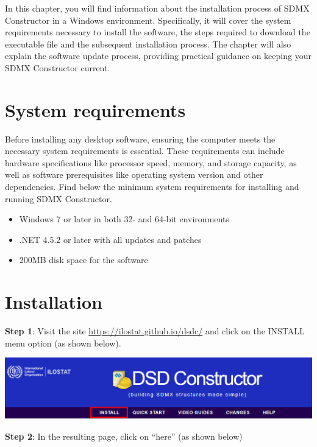 \documentclass[
]{book}
\providecommand{\tightlist}{%
  \setlength{\itemsep}{0pt}\setlength{\parskip}{0pt}}
\begin{document}
In this chapter, you will find information about the installation process of SDMX Constructor in a Windows environment. Specifically, it will cover the system requirements necessary to install the software, the steps required to download the executable file and the subsequent installation process. The chapter will also explain the software update process, providing practical guidance on keeping your SDMX Constructor current.

\hypertarget{system-requirements}{%
\section{System requirements}\label{system-requirements}}

Before installing any desktop software, ensuring the computer meets the necessary system requirements is essential. These requirements can include hardware specifications like processor speed, memory, and storage capacity, as well as software prerequisites like operating system version and other dependencies. Find below the minimum system requirements for installing and running SDMX Constructor.

\begin{itemize}
\tightlist
\item
  Windows 7 or later in both 32- and 64-bit environments
\item
  .NET 4.5.2 or later with all updates and patches
\item
  200MB disk space for the software
\end{itemize}

\hypertarget{installation}{%
\section{Installation}\label{installation}}

\textbf{Step 1}: Visit the site \url{https://ilostat.github.io/dsdc/} and click on the INSTALL menu option (as shown below).

\begin{center}\includegraphics[width=1\linewidth]{./images/image003} \end{center}

\textbf{Step 2}: In the resulting page, click on ``here'' (as shown below)
\end{document}
